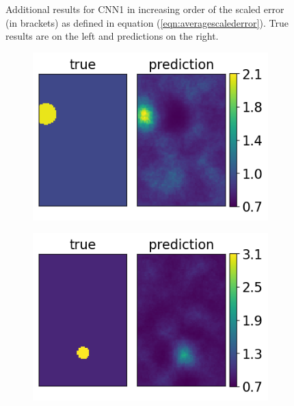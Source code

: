 \documentclass[12pt]{article}
\newcommand{\nhgappwidth}{0.24\linewidth}
\newcommand{\nhgappheight}{2.9cm}
\begin{document}
\begin{appendices}
\begin{figure}[!h]
\begin{subfigure}[c]{\nhgappwidth}
  \end{subfigure}
\caption{\label{fig:app1result} Additional results for CNN1 in increasing order of the scaled error (in brackets) as defined in equation (\ref{eqn:averagescalederror}). True results are on the left and predictions on the right.}  
\end{figure}
%
\begin{figure}[!h]
  \centering
  \begin{subfigure}[c]{\nhgappwidth}
    \centering    
    \includegraphics[totalheight=\nhgappheight]{Figures/AppendixNew/CNN2/ex5/mu.png}
  \end{subfigure}
  \begin{subfigure}[c]{\nhgappwidth}
    \centering    
    \includegraphics[totalheight=\nhgappheight]{Figures/AppendixNew/CNN2/ex6/mu.png}

\end{subfigure}
\end{figure}
\end{appendices}
\end{document}

